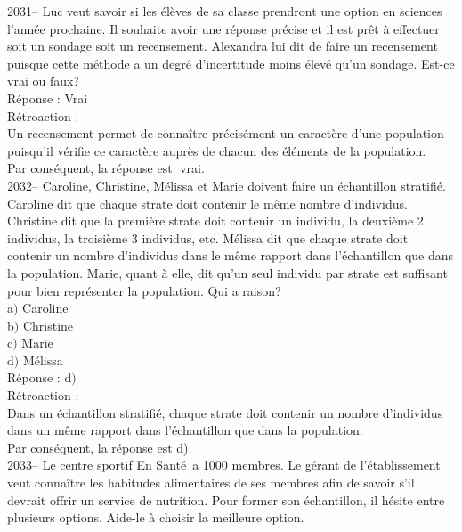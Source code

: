 \documentclass[letterpaper, 12pt]{article}
\begin{document}
2031-- Luc veut savoir si les \'el\`eves de sa classe prendront une option en sciences l'ann\'ee prochaine. Il souhaite avoir une r\'eponse pr\'ecise et il est pr\^et \`a effectuer soit un sondage soit un recensement. Alexandra lui dit de faire un recensement puisque cette m\'ethode a un degr\'e d'incertitude moins \'elev\'e qu'un sondage. Est-ce vrai ou faux? \\

R\'eponse : Vrai\\

R\'etroaction :\\
Un recensement permet de conna\^itre pr\'ecis\'ement un caract\`ere d'une population puisqu'il v\'erifie ce caract\`ere aupr\`es de chacun des \'el\'ements de la population. \\
Par cons\'equent, la r\'eponse est: vrai.\\


2032-- Caroline, Christine, M\'elissa et Marie doivent faire un \'echantillon stratifi\'e. Caroline dit que chaque strate doit contenir le m\^eme nombre d'individus. Christine dit que la premi\`ere strate doit contenir un individu, la deuxi\`eme 2 individus, la troisi\`eme 3 individus, etc. M\'elissa dit que chaque strate doit contenir un nombre d'individus dans le m\^eme rapport dans l'\'echantillon que dans la population. Marie, quant \`a elle, dit qu'un seul individu par strate est suffisant pour bien repr\'esenter la population. Qui a raison? \\

a$)$ Caroline\\
b$)$ Christine\\
c$)$ Marie\\
d$)$ M\'elissa\\

R\'eponse : d$)$\\

R\'etroaction :\\
Dans un \'echantillon stratifi\'e, chaque strate doit contenir un nombre d'individus dans un m\^eme rapport dans l'\'echantillon que dans la population.\\
Par cons\'equent, la r\'eponse est d).\\

2033-- Le centre sportif \og En Sant\'e \fg \,a 1000 membres. Le g\'erant de l'\'etablissement veut conna\^itre les habitudes alimentaires de ses membres afin de savoir s'il devrait offrir un service de nutrition. Pour former son \'echantillon, il h\'esite entre plusieurs options. Aide-le \`a choisir la meilleure option.\\
\end{document}

